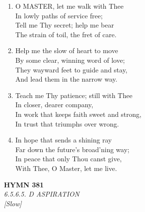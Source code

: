 \documentclass[11pt,a4paper]{article}
\begin{document}
\begin{enumerate}
    \item O MASTER, let me walk with Thee \\
        In lowly paths of service free; \\
        Tell me Thy secret; help me bear \\
        The strain of toil, the fret of care.

    \item Help me the slow of heart to move \\
        By some clear, winning word of love; \\
        They wayward feet to guide and stay, \\
        And lead them in the narrow way.

    \item Teach me Thy patience; still with Thee \\
        In closer, dearer company, \\
        In work that keeps faith sweet and strong, \\
        In trust that triumphs over wrong.

    \item In hope that sends a shining ray \\
        Far down the future's broad'ning way; \\
        In peace that only Thou canst give, \\
        With Thee, O Master, let me live.

\end{enumerate}

\newpage
\begin{center}
    {\Large \textbf{HYMN 381}}
    \\
    \textit{6.5.6.5. D ASPIRATION}
    \\
    \textit{\small [Slow]}
\end{center}
\vspace{1em}
\end{document}
